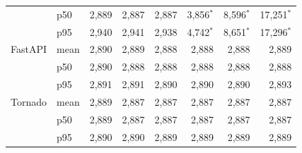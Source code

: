 \begin{table}[!htbp]
\begin{tabular}{@{}llrrrrrr@{}}
     & p50 & 2,889 & 2,887 & 2,887 & 3,856$^*$ & 8,596$^*$ & 17,251$^*$ \\
     & p95 & 2,940 & 2,941 & 2,938 & 4,742$^*$ & 8,651$^*$ & 17,296$^*$ \\
    \addlinespace
    FastAPI & mean & 2,890 & 2,889 & 2,888 & 2,888 & 2,888 & 2,889 \\
     & p50 & 2,890 & 2,888 & 2,888 & 2,888 & 2,888 & 2,888 \\
     & p95 & 2,891 & 2,891 & 2,890 & 2,890 & 2,890 & 2,893 \\
    \addlinespace
    Tornado & mean & 2,889 & 2,887 & 2,887 & 2,887 & 2,887 & 2,887 \\
     & p50 & 2,889 & 2,887 & 2,887 & 2,887 & 2,887 & 2,887 \\
     & p95 & 2,890 & 2,890 & 2,889 & 2,889 & 2,889 & 2,889 \\
    

\end{tabular}
\end{table}
